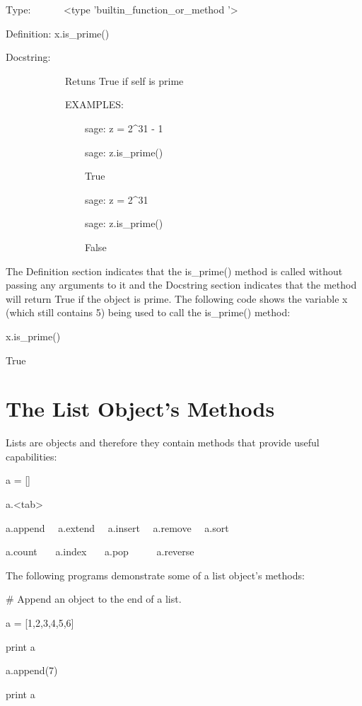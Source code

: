 \documentclass[12pt,oneside]{book}
\begin{document}
Type: \ \ \ \ \ \ {\textless}type 'builtin\_function\_or\_method '{\textgreater}

Definition: x.is\_prime()


Docstring: 


\ \ \ \ \ \ \ \ \ \ \ \ Retuns True if self is prime 


\ \ \ \ \ \ \ \ \ \ \ \ EXAMPLES: 

\ \ \ \ \ \ \ \ \ \ \ \ \ \ \ \ sage: z = 2\^{}31 {}- 1 

\ \ \ \ \ \ \ \ \ \ \ \ \ \ \ \ sage: z.is\_prime() 

\ \ \ \ \ \ \ \ \ \ \ \ \ \ \ \ True 

\ \ \ \ \ \ \ \ \ \ \ \ \ \ \ \ sage: z = 2\^{}31 

\ \ \ \ \ \ \ \ \ \ \ \ \ \ \ \ sage: z.is\_prime() 

\ \ \ \ \ \ \ \ \ \ \ \ \ \ \ \ False 


The Definition section indicates that the is\_prime() method is called without passing any arguments to it and the Docstring section indicates that the method will return True if the object is prime. The following code shows the variable x (which still contains 5) being used to call the is\_prime() method: 

x.is\_prime()

{\textbar}

True

\section[The List Object's Methods]{ The List Object's Methods}

Lists are objects and therefore they contain methods that provide useful capabilities: 

a = []

a.{\textless}tab{\textgreater}

{\textbar}

a.append \ \ a.extend \ \ a.insert \ \ a.remove \ \ a.sort 

a.count \ \ \ a.index \ \ \ a.pop \ \ \ \ \ a.reverse 


The following programs demonstrate some of a list object's methods: 

\# Append an object to the end of a list.

a = [1,2,3,4,5,6]

print a

a.append(7)

print a
\end{document}
